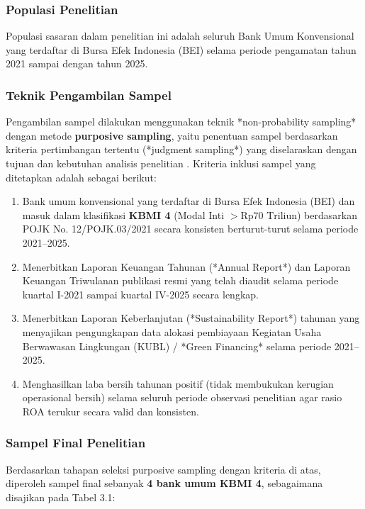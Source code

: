 \documentclass[12pt,a4paper]{article}
\numberwithin{equation}{section}
\begin{document}
\subsubsection{Populasi Penelitian}
\noindent
Populasi sasaran dalam penelitian ini adalah seluruh Bank Umum Konvensional yang terdaftar di Bursa Efek Indonesia (BEI) selama periode pengamatan tahun 2021 sampai dengan tahun 2025.

\subsubsection{Teknik Pengambilan Sampel}
\noindent
Pengambilan sampel dilakukan menggunakan teknik *non-probability sampling* dengan metode \textbf{purposive sampling}, yaitu penentuan sampel berdasarkan kriteria pertimbangan tertentu (*judgment sampling*) yang diselaraskan dengan tujuan dan kebutuhan analisis penelitian \citep{Sugiyono2019}. Kriteria inklusi sampel yang ditetapkan adalah sebagai berikut:
\begin{enumerate}
  \item Bank umum konvensional yang terdaftar di Bursa Efek Indonesia (BEI) dan masuk dalam klasifikasi \textbf{KBMI 4} (Modal Inti $> \text{Rp}70 \text{ Triliun}$) berdasarkan POJK No. 12/POJK.03/2021 secara konsisten berturut-turut selama periode 2021--2025.
  \item Menerbitkan Laporan Keuangan Tahunan (*Annual Report*) dan Laporan Keuangan Triwulanan publikasi resmi yang telah diaudit selama periode kuartal I-2021 sampai kuartal IV-2025 secara lengkap.
  \item Menerbitkan Laporan Keberlanjutan (*Sustainability Report*) tahunan yang menyajikan pengungkapan data alokasi pembiayaan Kegiatan Usaha Berwawasan Lingkungan (KUBL) / *Green Financing* selama periode 2021--2025.
  \item Menghasilkan laba bersih tahunan positif (tidak membukukan kerugian operasional bersih) selama seluruh periode observasi penelitian agar rasio ROA terukur secara valid dan konsisten.
\end{enumerate}

\subsubsection{Sampel Final Penelitian}
\noindent
Berdasarkan tahapan seleksi purposive sampling dengan kriteria di atas, diperoleh sampel final sebanyak \textbf{4 bank umum KBMI 4}, sebagaimana disajikan pada Tabel 3.1:
\end{document}
